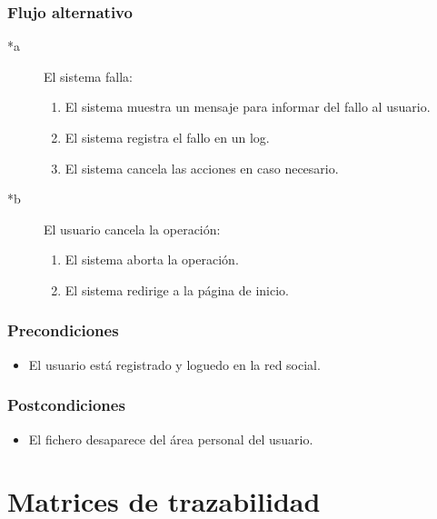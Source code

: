 \documentclass[12pt, a4paper, titlepage]{article}
\begin{document}
\subsubsection{Flujo alternativo}
	\begin{description}
	\item [*a] El sistema falla:
	\begin{enumerate}
		\item El sistema muestra un mensaje para informar del fallo al usuario.
		\item El sistema registra el fallo en un log.
		\item El sistema cancela las acciones en caso necesario.
	\end{enumerate}
\end{description}

\begin{description}
	\item [*b] El usuario cancela la operación:
	\begin{enumerate}
		\item El sistema aborta la operación.
		\item El sistema redirige a la página de inicio.
	\end{enumerate}
\end{description}

\subsubsection{Precondiciones}
\begin{itemize}
		\item El usuario está registrado y loguedo en la red social.
		
	\end{itemize}


\subsubsection{Postcondiciones}
	\begin{itemize}
		\item El fichero desaparece del área personal del usuario.
	\end{itemize}
\section{Matrices de trazabilidad}  
\end{document}
